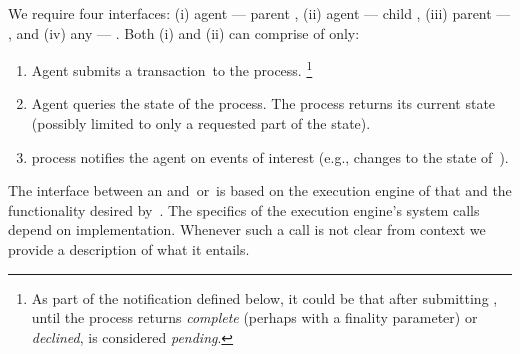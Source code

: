 We require four interfaces: (i) \ipc agent --- parent \smr, (ii) \ipc agent --- child \smr, (iii) parent \smr --- \sa, and (iv) any \smr --- \gw. Both (i) and (ii) can comprise of only:
\begin{enumerate}
    \item Agent submits a transaction~\tx to the \smr process.%
    \footnote{As part of the notification defined below, it could be that after submitting \tx, until the \smr process returns \textit{complete} (perhaps with a finality parameter) or \textit{declined}, \tx is considered \textit{pending}.}
    \item Agent queries the state of the \smr process. The \smr process returns its current state (possibly limited to only a requested part of the state).
    \item \smr process notifies the agent on events of interest (e.g., changes to the state of~\sa).
\end{enumerate}

The interface between an \smr and~\sa or~\gw is based on the execution engine of that \smr and the functionality desired by~\sa. The specifics of the execution engine's system calls depend on implementation. Whenever such a call is not clear from context we provide a description of what it entails. \\



